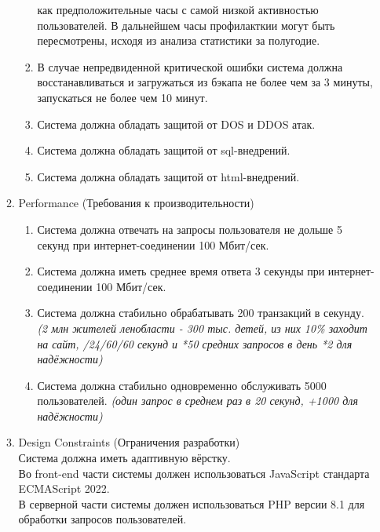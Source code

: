 \begin{enumerate}
\begin{enumerate}[label=3.\arabic*]
\begin{enumerate}[label=3.3.\arabic*]
            как предположительные часы с самой низкой активностью пользователей. В дальнейшем часы профилакткии могут быть пересмотрены,
            исходя из анализа статистики за полугодие.
            \item В случае непредвиденной критической ошибки система должна восстанавливаться и загружаться из бэкапа не более чем за 3 минуты, запускаться не более чем 10 минут.
            \item Система должна обладать защитой от DOS и DDOS атак.
            \item Система должна обладать защитой от sql-внедрений.
            \item Система должна обладать защитой от html-внедрений.
        \end{enumerate}
        \item Performance (Требования к производительности)
        \begin{enumerate}[label=3.4.\arabic*]
            \item Система должна отвечать на запросы пользователя не дольше 5 секунд при интернет-соединении 100 Мбит/сек.
            \item Система должна иметь среднее время ответа 3 секунды при интернет-соединении 100 Мбит/сек.
            \item Система должна стабильно обрабатывать 200 транзакций в секунду. \\
            \tiny \textit{(2 млн жителей ленобласти - 300 тыс. детей, из них 10\% заходит на сайт, /24/60/60 секунд и *50 средних запросов в день *2 для надёжности)}
            \normalsize
            \item Система должна стабильно одновременно обслуживать 5000 пользователей.
            \tiny \textit{(один запрос в среднем раз в 20 секунд, +1000 для надёжности)}
            \normalsize
        \end{enumerate}
        \item Design Constraints (Ограничения разработки) \\
        Система должна иметь адаптивную вёрстку. \\
        Во front-end части системы должен использоваться JavaScript стандарта ECMAScript 2022. \\
        В серверной части системы должен использоваться PHP версии 8.1 для обработки запросов пользователей.

\end{enumerate}
\end{enumerate}

